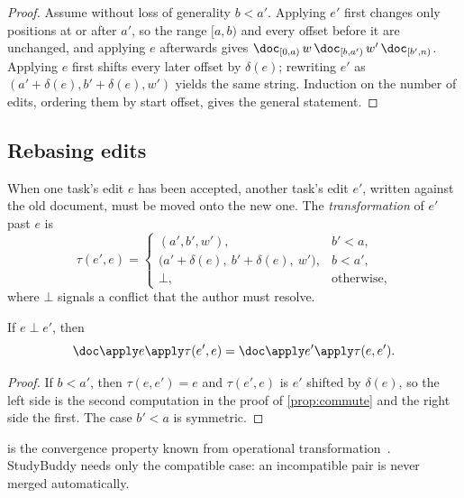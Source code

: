 \begin{proof}
Assume without loss of generality $b < a'$. Applying $e'$ first changes only
positions at or after $a'$, so the range $[a, b)$ and every offset before it are
unchanged, and applying $e$ afterwards gives
$\doc_{[0,a)}\, w\, \doc_{[b,a')}\, w'\, \doc_{[b',n)}$. Applying $e$ first
shifts every later offset by $\delta(e)$; rewriting $e'$ as
$(a'+\delta(e), b'+\delta(e), w')$ yields the same string. Induction on the
number of edits, ordering them by start offset, gives the general statement.
\end{proof}

\subsection{Rebasing edits}

When one task's edit $e$ has been accepted, another task's edit $e'$, written
against the old document, must be moved onto the new one. The
\emph{transformation} of $e'$ past $e$ is
\begin{equation}
  \tau(e', e) =
  \begin{cases}
    (a', b', w'), & b' < a,\\
    \bigl(a' + \delta(e),\ b' + \delta(e),\ w'\bigr), & b < a',\\
    \bot, & \text{otherwise,}
  \end{cases}
  \label{eq:transform}
\end{equation}
where $\bot$ signals a conflict that the author must resolve.

\begin{lemma}
\label{lem:tp1}
If $e \perp e'$, then
\begin{equation}
  \doc \apply e \apply \tau(e', e) = \doc \apply e' \apply \tau(e, e') .
  \label{eq:tp1}
\end{equation}
\end{lemma}

\begin{proof}
If $b < a'$, then $\tau(e, e') = e$ and $\tau(e', e)$ is $e'$ shifted by
$\delta(e)$, so the left side is the second computation in the proof of
\cref{prop:commute} and the right side the first. The case $b' < a$ is
symmetric.
\end{proof}

 is the convergence property known from operational
transformation~\cite{ellis1989}. StudyBuddy needs only the compatible case: an
incompatible pair is never merged automatically.

